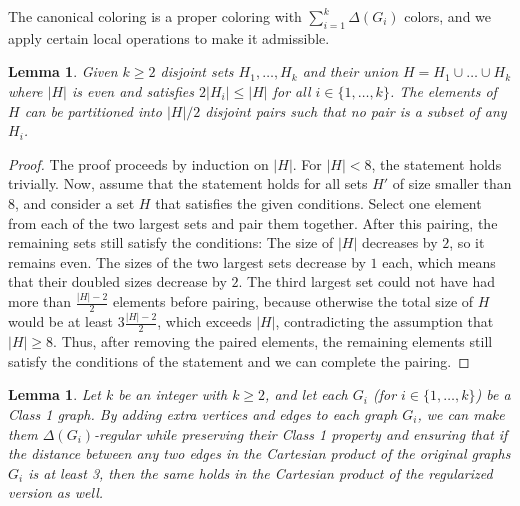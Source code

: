 \documentclass[a4paper,12pt]{article}
\newtheorem{lemma}[theorem]{\bf Lemma}
\begin{document}
The canonical coloring is a proper coloring with $\sum_{i=1}^k \Delta(G_i)$ colors, and we apply certain local operations to make it admissible.

\begin{lemma} \label{degrees}
    Given $k \geq 2$ disjoint sets $H_1, \dots, H_k$ and their union $H = H_1 \cup \dots \cup H_k$ where $|H|$ is even and satisfies $2|H_i| \le |H|$ for all $i \in \{1, \dots, k\}$. The elements of $H$ can be partitioned into $|H|/2$ disjoint pairs such that no pair is a subset of any $H_i$.
\end{lemma}

\begin{proof}
    The proof proceeds by induction on $|H|$. For $|H| < 8$, the statement holds trivially. Now, assume that the statement holds for all sets $H'$ of size smaller than $8$, and consider a set $H$ that satisfies the given conditions. Select one element from each of the two largest sets and pair them together. After this pairing, the remaining sets still satisfy the conditions: The size of $|H|$ decreases by $2$, so it remains even. The sizes of the two largest sets decrease by $1$ each, which means that their doubled sizes decrease by $2$. The third largest set could not have had more than $\frac{|H|-2}{2}$ elements before pairing, because otherwise the total size of $H$ would be at least $3\frac{|H|-2}{2}$, which exceeds $|H|$, contradicting the assumption that $|H| \geq 8$. Thus, after removing the paired elements, the remaining elements still satisfy the conditions of the statement and we can complete the pairing.
\end{proof}

\begin{lemma} \label{regularization}
    Let $k$ be an integer with $k \geq 2$, and let each $G_i$ (for $i \in \{1, \dots, k\}$) be a Class 1 graph. By adding extra vertices and edges to each graph $G_i$, we can make them $\Delta(G_i)$-regular while preserving their Class 1 property and ensuring that if the distance between any two edges in the Cartesian product of the original graphs $G_i$ is at least 3, then the same holds in the Cartesian product of the regularized version as well.
\end{lemma}
\end{document}
